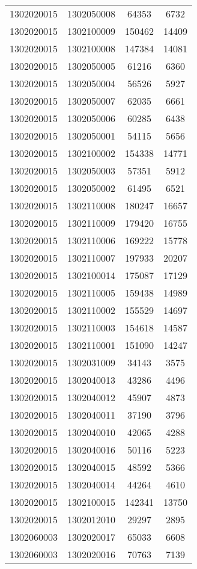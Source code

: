 \begin{longtable}{llcc}
1302020015 & 1302050008 & 64353 & 6732\\
1302020015 & 1302100009 & 150462 & 14409\\
1302020015 & 1302100008 & 147384 & 14081\\
1302020015 & 1302050005 & 61216 & 6360\\
1302020015 & 1302050004 & 56526 & 5927\\
1302020015 & 1302050007 & 62035 & 6661\\
1302020015 & 1302050006 & 60285 & 6438\\
1302020015 & 1302050001 & 54115 & 5656\\
1302020015 & 1302100002 & 154338 & 14771\\
1302020015 & 1302050003 & 57351 & 5912\\
1302020015 & 1302050002 & 61495 & 6521\\
1302020015 & 1302110008 & 180247 & 16657\\
1302020015 & 1302110009 & 179420 & 16755\\
1302020015 & 1302110006 & 169222 & 15778\\
1302020015 & 1302110007 & 197933 & 20207\\
1302020015 & 1302100014 & 175087 & 17129\\
1302020015 & 1302110005 & 159438 & 14989\\
1302020015 & 1302110002 & 155529 & 14697\\
1302020015 & 1302110003 & 154618 & 14587\\
1302020015 & 1302110001 & 151090 & 14247\\
1302020015 & 1302031009 & 34143 & 3575\\
1302020015 & 1302040013 & 43286 & 4496\\
1302020015 & 1302040012 & 45907 & 4873\\
1302020015 & 1302040011 & 37190 & 3796\\
1302020015 & 1302040010 & 42065 & 4288\\
1302020015 & 1302040016 & 50116 & 5223\\
1302020015 & 1302040015 & 48592 & 5366\\
1302020015 & 1302040014 & 44264 & 4610\\
1302020015 & 1302100015 & 142341 & 13750\\
1302020015 & 1302012010 & 29297 & 2895\\
1302060003 & 1302020017 & 65033 & 6608\\
1302060003 & 1302020016 & 70763 & 7139\\

\end{longtable}

